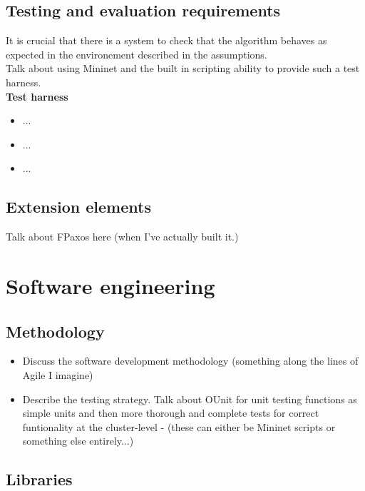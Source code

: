 {\subsection{Testing and evaluation requirements}

It is crucial that there is a system to check that the algorithm behaves as expected in the environement described in the assumptions. \\

Talk about using Mininet and the built in scripting ability to provide such a test harness. \\

\textbf{Test harness}
\begin{itemize}
  \item ...
  \item ...
  \item ...
\end{itemize}

{\color{green} \subsection{Extension elements}
Talk about FPaxos here (when I've actually built it.)}




\section{Software engineering}

\subsection{Methodology}
\begin{itemize}
  \item Discuss the software development methodology (something along the lines of Agile I imagine)
  \item Describe the testing strategy. Talk about OUnit for unit testing functions as simple units and then more thorough and complete tests for correct funtionality at the cluster-level - (these can either be Mininet scripts or something else entirely...)
\end{itemize}

\subsection{Libraries}

}
